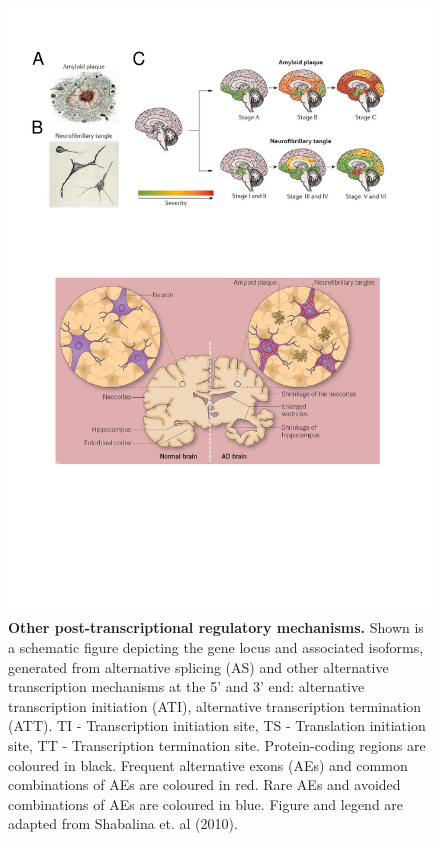 \vspace{1cm}
\begin{figure}[!ht]
	\centering
	\includegraphics[page=14,trim={0 15cm 1cm 2cm},clip, scale = 0.65]{Figures/Introduction_Figures.pdf}
	\captionsetup{width=0.95\textwidth,singlelinecheck=off}
	\caption[Other post-transcriptional regulatory mechanisms]%
	{\textbf{Other post-transcriptional regulatory mechanisms.} Shown is a schematic figure depicting the gene locus and associated isoforms, generated from alternative splicing (AS) and other alternative transcription mechanisms at the 5' and 3' end: alternative transcription initiation (ATI), alternative transcription termination (ATT). \newline
	TI - Transcription initiation site, TS - Translation initiation site, TT - Transcription termination site. Protein-coding regions are coloured in black. Frequent alternative exons (AEs) and common combinations of AEs are coloured in red. Rare AEs and avoided combinations of AEs are coloured in blue. Figure and legend are adapted from Shabalina et. al (2010)\cite{Shabalina2010}.
	}
	\label{fig:AS_others}
\end{figure}

